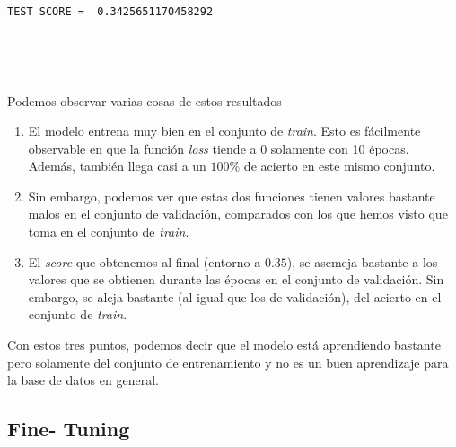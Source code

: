 \documentclass[11pt]{article}
\providecommand{\tightlist}{%
      \setlength{\itemsep}{0pt}\setlength{\parskip}{0pt}}
\begin{document}
    \begin{Verbatim}[commandchars=\\\{\}]

TEST SCORE =  0.3425651170458292
    \end{Verbatim}

    \begin{center}
    \end{center}
    { \hspace*{\fill} \\}
    
    \begin{center}
    \end{center}
    { \hspace*{\fill} \\}
    
    Podemos observar varias cosas de estos resultados

\begin{enumerate}
\def\labelenumi{\arabic{enumi}.}
\tightlist
\item
  El modelo entrena muy bien en el conjunto de \emph{train}. Esto es
  fácilmente observable en que la función \emph{loss} tiende a \(0\)
  solamente con 10 épocas. Además, también llega casi a un \(100\%\) de
  acierto en este mismo conjunto.
\item
  Sin embargo, podemos ver que estas dos funciones tienen valores
  bastante malos en el conjunto de validación, comparados con los que
  hemos visto que toma en el conjunto de \emph{train}.
\item
  El \emph{score} que obtenemos al final (entorno a \(0.35\)), se
  asemeja bastante a los valores que se obtienen durante las épocas en
  el conjunto de validación. Sin embargo, se aleja bastante (al igual
  que los de validación), del acierto en el conjunto de \emph{train}.
\end{enumerate}

Con estos tres puntos, podemos decir que el modelo está aprendiendo
bastante pero solamente del conjunto de entrenamiento y no es un buen
aprendizaje para la base de datos en general.

\hypertarget{fine--tuning}{%
\subsection{Fine- Tuning}\label{fine--tuning}}
\end{document}
